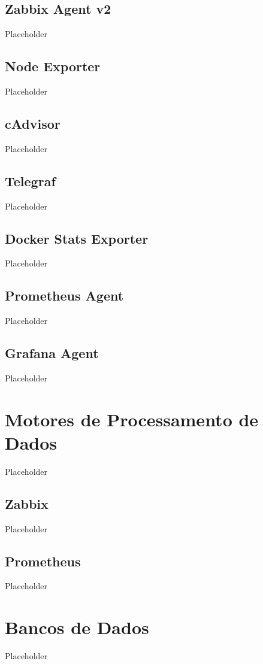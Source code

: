 \subsection{Zabbix Agent v2}
Placeholder

\subsection{Node Exporter}
Placeholder

\subsection{cAdvisor}
Placeholder

\subsection{Telegraf}
Placeholder

\subsection{Docker Stats Exporter}
Placeholder

\subsection{Prometheus Agent}
Placeholder

\subsection{Grafana Agent}
Placeholder

\section{Motores de Processamento de Dados}
Placeholder

\subsection{Zabbix}
Placeholder

\subsection{Prometheus}
Placeholder

\section{Bancos de Dados}
Placeholder

